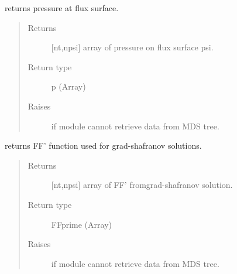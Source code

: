 \documentclass[letterpaper,10pt,english]{sphinxmanual}
\begin{document}
\begin{fulllineitems}
\begin{fulllineitems}
\begin{quote}
\begin{description}
\end{description}\end{quote}

\end{fulllineitems}


\begin{fulllineitems}
\label{\detokenize{eqtools:eqtools.CModEFIT.CModEFITTree.getFluxPres}}
returns pressure at flux surface.
\begin{quote}\begin{description}
\item[{Returns}] \leavevmode
{[}nt,npsi{]} array of pressure on flux surface psi.

\item[{Return type}] \leavevmode
p (Array)

\item[{Raises}] \leavevmode
{} \textendash{} if module cannot retrieve data from MDS tree.

\end{description}\end{quote}

\end{fulllineitems}


\begin{fulllineitems}
\label{\detokenize{eqtools:eqtools.CModEFIT.CModEFITTree.getFFPrime}}
returns FF’ function used for grad-shafranov solutions.
\begin{quote}\begin{description}
\item[{Returns}] \leavevmode
{[}nt,npsi{]} array of FF’ fromgrad-shafranov solution.

\item[{Return type}] \leavevmode
FFprime (Array)

\item[{Raises}] \leavevmode
{} \textendash{} if module cannot retrieve data from MDS tree.


\end{description}
\end{quote}
\end{fulllineitems}
\end{fulllineitems}
\end{document}
